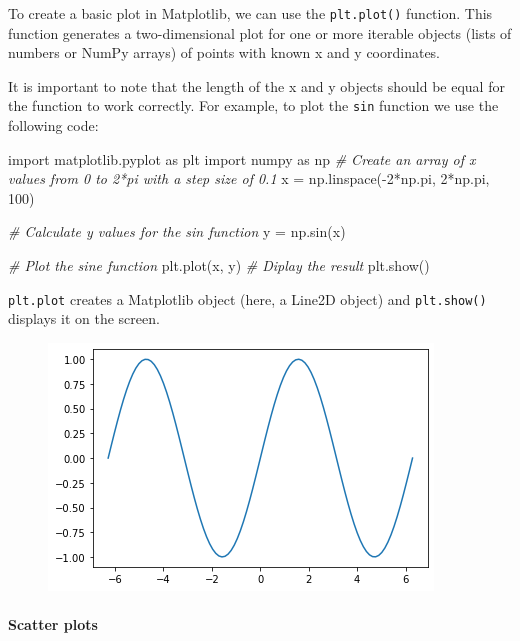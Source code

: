 \documentclass[11pt]{article}
\newenvironment{Shaded}{}{}
\newcommand{\DecValTok}[1]{\textcolor[rgb]{0.25,0.63,0.44}{{#1}}}
\newcommand{\CommentTok}[1]{\textcolor[rgb]{0.38,0.63,0.69}{\textit{{#1}}}}
\newcommand{\NormalTok}[1]{{#1}}
\newcommand{\ImportTok}[1]{{#1}}
\newcommand{\OperatorTok}[1]{\textcolor[rgb]{0.40,0.40,0.40}{{#1}}}
\begin{document}
To create a basic plot in Matplotlib, we can use the \texttt{plt.plot()}
function. This function generates a two-dimensional plot for one or more
iterable objects (lists of numbers or NumPy arrays) of points with known
x and y coordinates.

It is important to note that the length of the x and y objects should be
equal for the function to work correctly. For example, to plot the
\texttt{sin} function we use the following code:

\begin{Shaded}
\begin{Highlighting}[]
\ImportTok{import}\NormalTok{ matplotlib.pyplot }\ImportTok{as}\NormalTok{ plt}
\ImportTok{import}\NormalTok{ numpy }\ImportTok{as}\NormalTok{ np}
\CommentTok{\# Create an array of x values from 0 to 2*pi with a step size of 0.1}
\NormalTok{x }\OperatorTok{=}\NormalTok{ np.linspace(}\OperatorTok{{-}}\DecValTok{2}\OperatorTok{*}\NormalTok{np.pi, }\DecValTok{2}\OperatorTok{*}\NormalTok{np.pi, }\DecValTok{100}\NormalTok{)}

\CommentTok{\# Calculate y values for the sin function}
\NormalTok{y }\OperatorTok{=}\NormalTok{ np.sin(x)}

\CommentTok{\# Plot the sine function}
\NormalTok{plt.plot(x, y)}
\CommentTok{\# Diplay the result}
\NormalTok{plt.show()}
\end{Highlighting}
\end{Shaded}

\texttt{plt.plot} creates a Matplotlib object (here, a Line2D object)
and \texttt{plt.show()} displays it on the screen.

\begin{figure}
\centering
\includegraphics[scale=0.6]{plot.png}
\end{figure}

\hypertarget{scatter-plots}{%
\paragraph{Scatter plots}\label{scatter-plots}}
\end{document}
